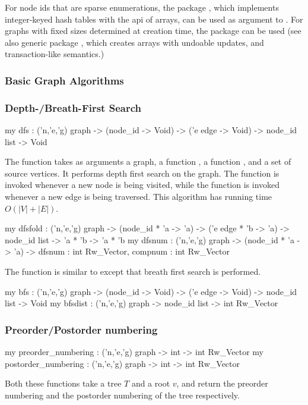 For node ids that are sparse enumerations, the package , 
which implements integer-keyed hash tables
with the api of arrays, can be used
as argument to .  
For graphs with fixed sizes determined at creation time,
the package  can be used (see also 
generic package ,
which creates arrays with undoable updates, and transaction-like semantics.)

\subsubsection{Basic Graph Algorithms}

\subsubsection{Depth-/Breath-First Search}

\begin{SML}
   my dfs : ('n,'e,'g) graph  ->
             (node_id -> Void) ->
             ('e edge -> Void) ->
             node_id list -> Void
\end{SML}
   The function  takes as arguments a graph,
a function , a function 
, and a
set of source vertices.  It performs depth first search on the
graph.  The function  is invoked 
whenever a new node is being visited, while the function 
is invoked whenever a new edge is being traversed.
This algorithm has running time $O(|V|+|E|)$.

\begin{SML}
   my dfsfold : ('n,'e,'g) graph  ->
                 (node_id * 'a -> 'a) ->
                 ('e edge * 'b -> 'a) ->
                 node_id list -> 'a * 'b -> 'a * 'b
   my dfsnum :  ('n,'e,'g) graph  ->
                 (node_id * 'a -> 'a) ->
                 { dfsnum : int Rw_Vector, compnum : int Rw_Vector }
\end{SML}

   The function  is similar to 
except that breath first search is performed.
\begin{SML} 
   my bfs : ('n,'e,'g) graph  ->
             (node_id -> Void) ->
             ('e edge -> Void) ->
             node_id list -> Void
   my bfsdist : ('n,'e,'g) graph -> node_id list -> int Rw_Vector
\end{SML} 

\subsubsection{Preorder/Postorder numbering}
\begin{SML}
   my preorder_numbering  : ('n,'e,'g) graph -> int -> int Rw_Vector
   my postorder_numbering : ('n,'e,'g) graph -> int -> int Rw_Vector
\end{SML}  
   Both these functions take a tree $T$ and a root $v$, and return
the preorder numbering and the postorder numbering of the tree respectively. 

